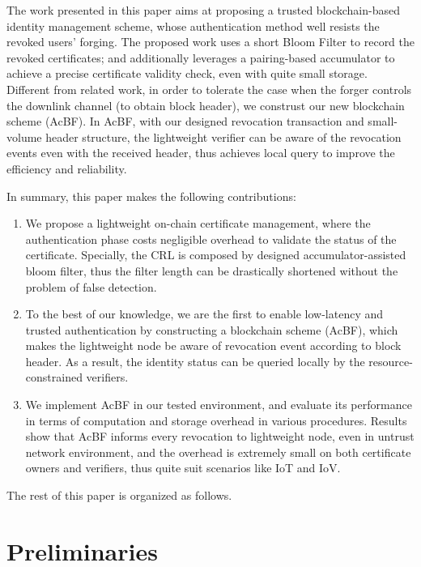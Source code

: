\documentclass[conference]{IEEEtran}
\begin{document}
The work presented in this paper aims at proposing a trusted blockchain-based identity management scheme, whose authentication method well resists the revoked users' forging. The proposed work uses a short Bloom Filter to record the revoked certificates; and additionally leverages a pairing-based accumulator to achieve a precise certificate validity check, even with quite small storage. Different from related work, in order to tolerate the case when the forger controls the downlink channel (to obtain block header), we construst our new blockchain scheme (AcBF). In AcBF, with our designed revocation transaction and small-volume header structure, the lightweight verifier can be aware of the revocation events even with the received header, thus achieves local query to improve the efficiency and reliability.

In summary, this paper makes the following contributions:
\begin{enumerate}
	\item We propose a lightweight on-chain certificate management, where the authentication phase costs negligible overhead to validate the status of the certificate. Specially, the CRL is composed by designed accumulator-assisted bloom filter, thus the filter length can be drastically shortened without the problem of false detection. 
	\item To the best of our knowledge, we are the first to enable low-latency and trusted authentication by constructing a blockchain scheme (AcBF), which makes the lightweight node be aware of revocation event according to block header. As a result, the identity status can be queried locally by the resource-constrained verifiers.
	\item We implement AcBF in our tested environment, and evaluate its performance in terms of computation and storage overhead in various procedures. Results show that AcBF informs every revocation to lightweight node, even in untrust network environment, and the overhead is extremely small on both certificate owners and verifiers, thus quite suit scenarios like IoT and IoV.
\end{enumerate}

The rest of this paper is organized as follows. 


\section{Preliminaries}
\end{document}
